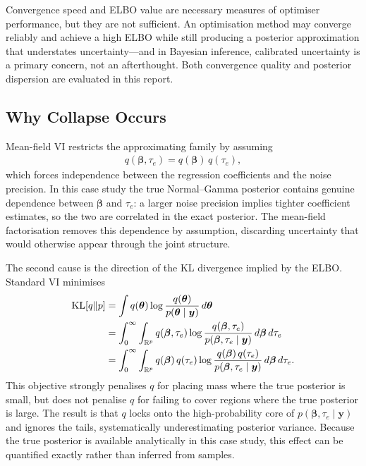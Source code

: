 \documentclass[11pt,a4paper]{article}
\newcommand{\R}{\mathbb{R}}
\begin{document}
Convergence speed and ELBO value are necessary measures of optimiser performance, but they are not sufficient. An optimisation method may converge reliably and achieve a high ELBO while still producing a posterior approximation that understates uncertainty---and in Bayesian inference, calibrated uncertainty is a primary concern, not an afterthought. Both convergence quality and posterior dispersion are evaluated in this report.

\subsection{Why Collapse Occurs}

Mean-field VI restricts the approximating family by assuming
\begin{align}
q(\bm{\beta},\tau_e) = q(\bm{\beta})\,q(\tau_e),
\end{align}
which forces independence between the regression coefficients and the noise precision. In this case study the true Normal--Gamma posterior contains genuine dependence between $\bm{\beta}$ and $\tau_e$: a larger noise precision implies tighter coefficient estimates, so the two are correlated in the exact posterior. The mean-field factorisation removes this dependence by assumption, discarding uncertainty that would otherwise appear through the joint structure.

The second cause is the direction of the KL divergence implied by the ELBO. Standard VI minimises
\begin{align}
\mathrm{KL}[q\|p] &= \int q(\bm{\theta})\log\frac{q(\bm{\theta})}{p(\bm{\theta}\mid\bm{y})}\,d\bm{\theta} \notag\\
                   &= \int_0^\infty \int_{\R^p} q(\bm{\beta},\tau_e)\log\frac{q(\bm{\beta},\tau_e)}{p(\bm{\beta},\tau_e\mid\bm{y})}\,d\bm{\beta}\,d\tau_e \notag\\
                   &= \int_0^\infty \int_{\R^p} q(\bm{\beta})\,q(\tau_e)\log\frac{q(\bm{\beta})\,q(\tau_e)}{p(\bm{\beta},\tau_e\mid\bm{y})}\,d\bm{\beta}\,d\tau_e.
\end{align}
This objective strongly penalises $q$ for placing mass where the true posterior is small, but does not penalise $q$ for failing to cover regions where the true posterior is large. The result is that $q$ locks onto the high-probability core of $p(\bm{\beta},\tau_e\mid\bm{y})$ and ignores the tails, systematically underestimating posterior variance. Because the true posterior is available analytically in this case study, this effect can be quantified exactly rather than inferred from samples.
\end{document}
